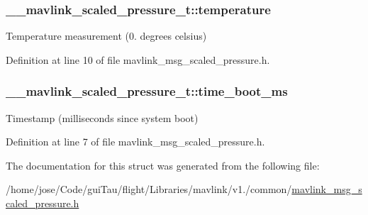 \hypertarget{struct____mavlink__scaled__pressure__t_ac9c9eba0a5fce8ca9324859b1b9ab413}{
\subsubsection[{temperature}]{ \-\_\-\-\_\-mavlink\-\_\-scaled\-\_\-pressure\-\_\-t\-::temperature}}\label{struct____mavlink__scaled__pressure__t_ac9c9eba0a5fce8ca9324859b1b9ab413}


Temperature measurement (0. degrees celsius) 



Definition at line 10 of file mavlink\-\_\-msg\-\_\-scaled\-\_\-pressure.\-h.

\hypertarget{struct____mavlink__scaled__pressure__t_a86306943b70fe3c60db24d56c90daf70}{
\subsubsection[{time\-\_\-boot\-\_\-ms}]{ \-\_\-\-\_\-mavlink\-\_\-scaled\-\_\-pressure\-\_\-t\-::time\-\_\-boot\-\_\-ms}}\label{struct____mavlink__scaled__pressure__t_a86306943b70fe3c60db24d56c90daf70}


Timestamp (milliseconds since system boot) 



Definition at line 7 of file mavlink\-\_\-msg\-\_\-scaled\-\_\-pressure.\-h.



The documentation for this struct was generated from the following file\-:\begin{DoxyCompactItemize}
\item 
/home/jose/\-Code/gui\-Tau/flight/\-Libraries/mavlink/v1./common/\hyperlink{mavlink__msg__scaled__pressure_8h}{mavlink\-\_\-msg\-\_\-scaled\-\_\-pressure.\-h}\end{DoxyCompactItemize}
